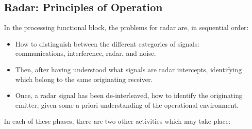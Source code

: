 













\subsection{Radar: Principles of Operation}



In the processing functional block, the problems for radar are, in sequential order:

\begin{itemize}
    \item How to distinguish between the different categories of signals: communications, interference, radar, and noise.
    \item Then, after having understood what signals are radar intercepts, identifying which belong to the same originating receiver. 
    \item Once, a radar signal has been de-interleaved, how to identify the originating emitter, given some a priori understanding of the operational environment.
\end{itemize}

In each of these phases, there are two other activities which may take place:


